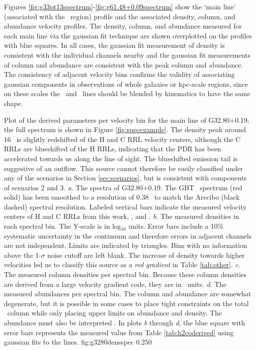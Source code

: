 Figures \ref{fig:g33pt13spectrum}-\ref{fig:g61.48+0.09spectrum} show the `main
line' (associated with the \uchii\ region) profile and the associated density,
column, and abundance velocity profiles.  The density, column, and abundance
measured for each main line via the gaussian fit technique are shown
overplotted on the profiles with blue squares.  In all cases, the gaussian fit
measurement of density is consistent with the individual channels nearby and
the gaussian fit measurements of column and abundance are consistent with the
peak column and abundance.  The consistency of adjacent velocity bins confirms
the validity of associating gaussian components in observations of whole
galaxies \citep[e.g., ][]{Mangum2008} or kpc-scale regions, since on these scales
the \oneone\ and \twotwo\ lines should be blended by kinematics to have the
same shape.

{ %
Plot of the derived parameters per velocity bin for the main line of
G32.80+0.19; the full spectrum is shown in Figure \ref{fig:specexample}.  The
density peak around 16 \kms\ is slightly redshifted of the H and C RRL velocity
centers, although the C RRLs are blueshifted of the H
RRLs, indicating that the PDR has been accelerated towards us along the line of
sight.  The blueshifted emission tail is suggestive of an outflow.  This source
cannot therefore be easily classified under any of the scenarios in Section
\ref{sec:scenarios}, but is consistent with components of scenarios 2 and 3. 
{\it a.} The spectra of G32.80+0.19.  The GBT \twotwo\ spectrum (red solid) has
been smoothed to a resolution of 0.38 \kms\ to match the Arecibo (black dashed)
spectral resolution.   Labeled vertical bars indicate the measured velocity centers
of H and C RRLs from this work, \citet{Roshi2005}, and \citet{Churchwell2010}. 
{\it b.} The measured densities in each spectral bin.  The Y-scale is in log$_{10}$
units. Error bars include a 10\% systematic uncertainty in the continuum and
therefore errors in adjacent channels are not independent.  Limits are
indicated by triangles.  Bins with no information above the 1-$\sigma$ noise
cutoff are left blank.  The increase of density towards higher velocities led us
to classify this source as a {\it red gradient} in Table \ref{tab:other}. 
{\it c.} The measured column densities per spectral bin.  Because these column
densities are derived from a large velocity gradient code, they are in
\perkmspc\ units.
{\it d.} The measured abundances per spectral bin.  The column and abundance are 
somewhat degenerate, but it is possible in some cases to place tight constraints
on the total \ortho\ column while only placing upper limits on abundance
and density.  The abundance must also be interpreted \perkmspc. 
In plots {\it b} through {\it d}, the blue square with error bars
represents the measured value from Table \ref{tab:h2coderived} using gaussian
fits to the lines.
}
{fig:g3280densspec}
{0.25}{0}

